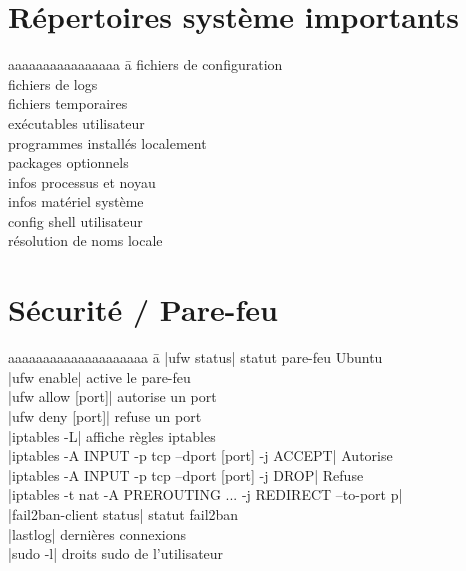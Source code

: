 \documentclass{article}
\begin{document}
\begin{multicols}{4}
    \section*{Répertoires système importants}
    \begin{tabbing}
        aaaaaaaaaaaaaaaa \= a \kill
         \> fichiers de configuration \\
         \> fichiers de logs \\
         \> fichiers temporaires \\
         \> exécutables utilisateur \\
         \> programmes installés localement \\
         \> packages optionnels \\
         \> infos processus et noyau \\
         \> infos matériel système \\
         \> config shell utilisateur \\
         \> résolution de noms locale
    \end{tabbing}

    \section*{Sécurité / Pare-feu}
    \begin{tabbing}
        aaaaaaaaaaaaaaaaaaaa \= a \kill
        \code|ufw status| \> statut pare-feu Ubuntu \\
        \code|ufw enable| \> active le pare-feu \\
        \code|ufw allow [port]| \> autorise un port \\
        \code|ufw deny [port]| \> refuse un port \\
        \code|iptables -L| \> affiche règles iptables \\
        \code|iptables -A INPUT -p tcp --dport [port] -j ACCEPT| Autorise \\
        \code|iptables -A INPUT -p tcp --dport [port] -j DROP| Refuse \\
        \code|iptables -t nat -A PREROUTING ... -j REDIRECT --to-port p| \\

        \code|fail2ban-client status| statut fail2ban \\
        \code|lastlog| \> dernières connexions \\
        \code|sudo -l| \> droits sudo de l'utilisateur
    \end{tabbing}



\end{multicols}
\end{document}
